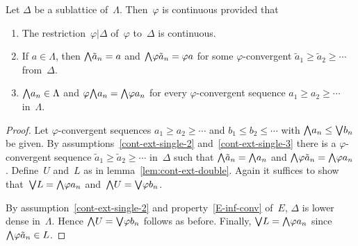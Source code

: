 \documentclass[main.tex]{subfiles}
\begin{document}
\begin{lem}
\label{lem:cont-ext-single}
Let $\Delta$ be a sublattice of~$\Lambda$.
Then~$\varphi$ is continuous provided that
\begin{enumerate}
\item
\label{cont-ext-single-1}
The restriction~$\varphi|\Delta$
of~$\varphi$ to~$\Delta$ is continuous.

\item
\label{cont-ext-single-2}
If $a\in \Lambda$,
then
$\textstyle{\bigwedge}\tilde a_n = a$ and $\textstyle{\bigwedge} \varphi \tilde a_n = \varphi a$
for some $\varphi$-convergent $\tilde a_1 \geq \tilde a_2 \geq \dotsb$
from~$\Delta$.

\item
\label{cont-ext-single-3}
$\textstyle{\bigwedge} a_n \in \Lambda$ and $\varphi \textstyle{\bigwedge} a_n = \textstyle{\bigwedge} \varphi a_n$
for every $\varphi$-convergent sequence $a_1 \geq a_2 \geq \dotsb$
in~$\Lambda$.
\end{enumerate}
\end{lem}
\begin{proof}
Let $\varphi$-convergent sequences
$a_1 \geq a_2 \geq \dotsb$
and $b_1 \leq b_2 \leq \dotsb$
with $\textstyle{\bigwedge} a_n \leq \textstyle{\bigvee} b_n$ be given.
By assumptions~\ref{cont-ext-single-2} and~\ref{cont-ext-single-3}
there is a $\varphi$-convergent sequence 
$\tilde a_1 \geq \tilde a_2 \geq \dotsb$ in~$\Delta$
such that $\textstyle{\bigwedge} \tilde a_n = \textstyle{\bigwedge} a_n$
and $\textstyle{\bigwedge}\varphi\tilde a_n = \textstyle{\bigwedge}\varphi a_n$.
Define~$U$ and~$L$ as in lemma~\ref{lem:cont-ext-double}.
Again it suffices to show that~$\textstyle{\bigvee} L = \textstyle{\bigwedge} \varphi a_n$
and~$\textstyle{\bigwedge} U = \textstyle{\bigvee} \varphi b_n$.

By assumption~\ref{cont-ext-single-2}
and property~\ref{E-inf-conv} of~$E$,
$\Delta$ is lower dense in~$\Lambda$.
Hence $\textstyle{\bigwedge} U = \textstyle{\bigvee} \varphi b_n$ follows as before.
Finally, $\textstyle{\bigvee} L = \textstyle{\bigwedge} \varphi a_n$  since $\textstyle{\bigwedge} \varphi \tilde a_n \in L$.
\end{proof}
\end{document}
